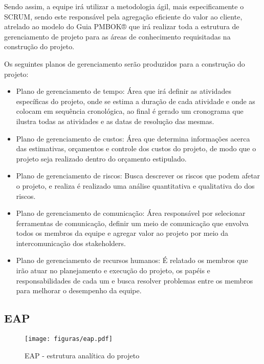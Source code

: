Sendo assim, a equipe irá utilizar a metodologia ágil, mais especificamente o SCRUM, sendo este responsável pela agregação eficiente do valor ao cliente, atrelado ao modelo do Guia PMBOK® que irá realizar toda a estrutura de gerenciamento de projeto para as áreas de conhecimento requisitadas na construção do projeto.\cite{pmbok} \cite{scrum}

Os seguintes planos de gerenciamento serão produzidos para a construção do projeto:

\begin{itemize}
	
	\item Plano de gerenciamento de tempo: Área que irá definir as atividades específicas do projeto, onde se estima a duração de cada atividade e onde as colocam em sequência cronológica, ao final é gerado um cronograma que ilustra todas as atividades e as datas de resolução das mesmas.
	
	\item Plano de gerenciamento de custos: Área que determina informações acerca das estimativas, orçamentos e controle dos custos do projeto, de modo que o projeto seja realizado dentro do orçamento estipulado.
	
	\item Plano de gerenciamento de riscos: Busca descrever os riscos que podem afetar o projeto, e realiza é realizado uma análise quantitativa e qualitativa do dos riscos.
	
	\item Plano de gerenciamento de comunicação: Área responsável por selecionar ferramentas de comunicação, definir um meio de comunicação que envolva todos os membros da equipe e agregar valor ao projeto por meio da intercomunicação dos stakeholders.
	
	\item Plano de gerenciamento de recursos humanos: É relatado os membros que irão atuar no planejamento e execução do projeto, os papéis e responsabilidades de cada um e busca resolver problemas entre os membros para melhorar o desempenho da equipe.
	
\end{itemize}

\subsection{EAP}

\begin{figure}[H]
	\centering
	\texttt{[image: figuras/eap.pdf]}
	\caption{EAP - estrutura analítica do projeto} \label{eap}
\end{figure}

